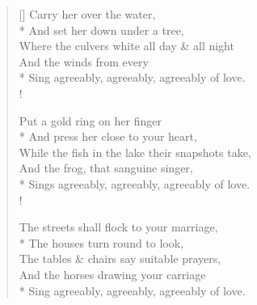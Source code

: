 \documentclass[MAIN]{subfiles}
\begin{document}
\settowidth{\versewidth}{Sing agreeably, agreeably, agreeably of love.}
\begin{verse}[\versewidth]
Carry her over the water,\\*
\vin And set her down under a tree,\\
Where the culvers white all day \& all night\\
\vin And the winds from every \\*
Sing agreeably, agreeably, agreeably of love.\\!

Put a gold ring on her finger\\*
\vin And press her close to your heart,\\
While the fish in the lake their snapshots take,\\
\vin And the frog, that sanguine singer,\\*
Sings agreeably, agreeably, agreeably of love.\\!

The streets shall flock to your marriage,\\*
\vin The houses turn round to look,\\
The tables \& chairs say suitable prayers,\\
\vin And the horses drawing your carriage\\*
Sing agreeably, agreeably, agreeably of love.
\end{verse}
\end{document}
